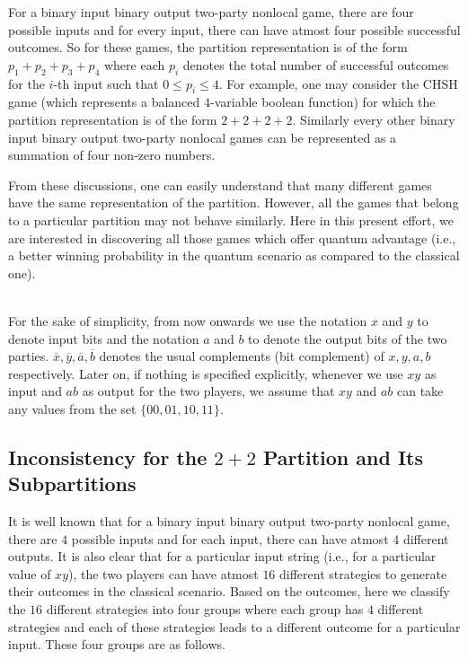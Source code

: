 \documentclass[]{svjour3}
\begin{document}
For a binary input binary output two-party nonlocal game, there are four possible inputs and for every input, there can have atmost four possible successful outcomes. So for these games, the partition representation is of the form $p_1+p_2+p_3+p_4$ where each $p_i$ denotes the total number of successful outcomes for the $i$-th input such that $0 \leq p_i \leq 4$. For example, one may consider the CHSH game (which represents a balanced $4$-variable boolean function) for which the partition representation is of the form $2+2+2+2$. Similarly every other binary input binary output two-party nonlocal games can be represented as a summation of four non-zero numbers. 

From these discussions, one can easily understand that many different games have the same representation of the partition. However, all the games that belong to a particular partition may not behave similarly. Here in this present effort, we are interested in discovering all those games which offer quantum advantage (i.e., a better winning probability in the quantum scenario as compared to the classical one).

\\


For the sake of simplicity, from now onwards we use the notation $x$ and $y$ to denote input bits and the notation $a$ and $b$ to denote the output bits of the two parties. $\overline{x}, \overline{y}, \overline{a}, \overline{b}$ denotes the usual complements (bit complement) of $x, y, a, b$ respectively. Later on, if nothing is specified explicitly, whenever we use $xy$ as input and $ab$ as output for the two players, we assume that $xy$ and $ab$ can take any values from the set $\{00, 01, 10, 11\}$.

\subsection{Inconsistency for the $2+2$ Partition and Its Subpartitions} 
\label{incos} 


It is well known that for a binary input binary output two-party nonlocal game, there are $4$ possible inputs and for each input, there can have atmost $4$ different outputs. It is also clear that for a particular input string (i.e., for a particular value of $xy$), the two players can have atmost $16$ different strategies to generate their outcomes in the classical scenario. Based on the outcomes, here we classify the $16$ different strategies into four groups where each group has $4$ different strategies and each of these strategies leads to a different outcome for a particular input. These four groups are as follows.\\
\end{document}
